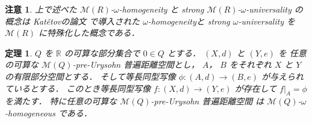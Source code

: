 \documentclass[leqno, 12pt]{jsarticle}
\newtheorem{thm}{定理}[section]
\newtheorem*{rmk}{注意}
\newcommand{\rr}{\mathbb{R}}
\newcommand{\Met}[1]{\mathscr{M}(#1)}
\newcommand{\restr}[2]{#1|_{#2}}
\begin{document}
\begin{rmk}\label{rmk:homogeneity:katetov-terminology}
上で述べた
$\Met{R}$-$\omega$-homogeneity
と
strong
$\Met{R}$-$\omega$-universality
の概念は
Kat\v{e}tovの論文
 \cite{Ka}
で導入された
$\omega$-homogeneityと
strong
$\omega$-universality
を
$\Met{R}$
に特殊化した概念である．
\end{rmk}



\begin{thm}\label{thm:pp:doukeipre}
$Q$
を
$\rr$
の可算な部分集合で
$0\in Q$
とする．
$(X, d)$
と
$(Y, e)$
を
任意の可算な
$\Met{Q}$-pre-Urysohn
普遍距離空間とし，
$A$，
$B$
をそれぞれ
$X$
と
$Y$
の有限部分空間とする．
そして等長同型写像
$\phi\colon (A, d)\to (B, e)$
が与えられているとする．
このとき等長同型写像
$f\colon (X, d)\to (Y, e)$
が存在して
$\restr{f}{A}=\phi$
を満たす．
特に任意の可算な
$\Met{Q}$-pre-Urysohn
普遍距離空間
は
$\Met{Q}$-$\omega$-homogeneous
である．
\end{thm}
\end{document}
